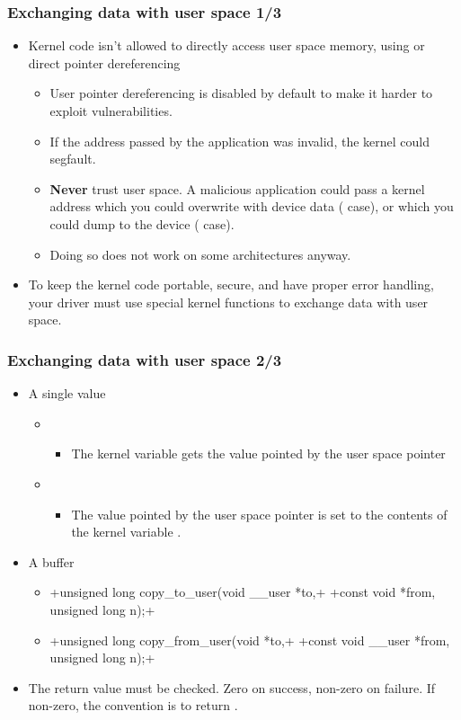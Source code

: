 \begin{frame}
  \frametitle{Exchanging data with user space 1/3}
  \begin{itemize}
  \item Kernel code isn't allowed to directly access user space
    memory, using  or direct pointer dereferencing
    \begin{itemize}
    \item User pointer dereferencing is disabled by default to make it
      harder to exploit vulnerabilities.
    \item If the address passed by the application was invalid, the
      kernel could segfault.
    \item {\bf Never} trust user space. A malicious application could
      pass a kernel address which you could overwrite with device data
      ( case), or which you could dump to the device
      ( case).
    \item Doing so does not work on some architectures anyway.
    \end{itemize}
  \item To keep the kernel code portable, secure, and have proper
    error handling, your driver must use special kernel functions
    to exchange data with user space.
  \end{itemize}
\end{frame}

\begin{frame}[fragile]
  \frametitle{Exchanging data with user space 2/3}
  \begin{itemize}
  \item A single value
    \begin{itemize}
    \item {}
      \begin{itemize}
      \item The kernel variable  gets the value pointed by the
        user space pointer 
      \end{itemize}
    \item {}
      \begin{itemize}
      \item The value pointed by the user space pointer  is
        set to the contents of the kernel variable .
      \end{itemize}
    \end{itemize}
  \item A buffer
    \begin{itemize}
    \item {}+unsigned long copy_to_user(void __user *to,+
      +const void *from, unsigned long n);+
    \item {}+unsigned long copy_from_user(void *to,+
      +const void __user *from, unsigned long n);+
    \end{itemize}
  \item The return value must be checked. Zero on success, non-zero on
    failure. If non-zero, the convention is to return \code{-}.
  \end{itemize}
\end{frame}


